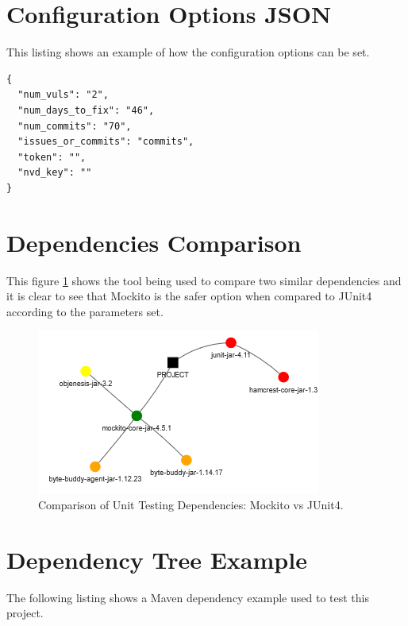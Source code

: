 \documentclass[conference]{IEEEtran}
\begin{document}


\appendices

\section{Configuration Options JSON}
This listing shows an example of how the configuration options can be set. 

\begin{lstlisting}[caption=Configuration Options]
{
  "num_vuls": "2",
  "num_days_to_fix": "46",
  "num_commits": "70",
  "issues_or_commits": "commits",
  "token": "",
  "nvd_key": ""
}
\end{lstlisting}

\section{Dependencies Comparison}
This figure \ref{fig:comp} shows the tool being used to compare two similar dependencies and it is clear to see that Mockito is the safer option when compared to JUnit4 according to the parameters set. 

\begin{figure}[H]
    \centering
    \includegraphics[width=1\linewidth]{Comparison.png}
    \caption{Comparison of Unit Testing Dependencies: Mockito vs JUnit4.} 
    \label{fig:comp}
\end{figure}

\newpage

\section{Dependency Tree Example}
The following listing shows a Maven dependency example used to test this project. 
\end{document}
